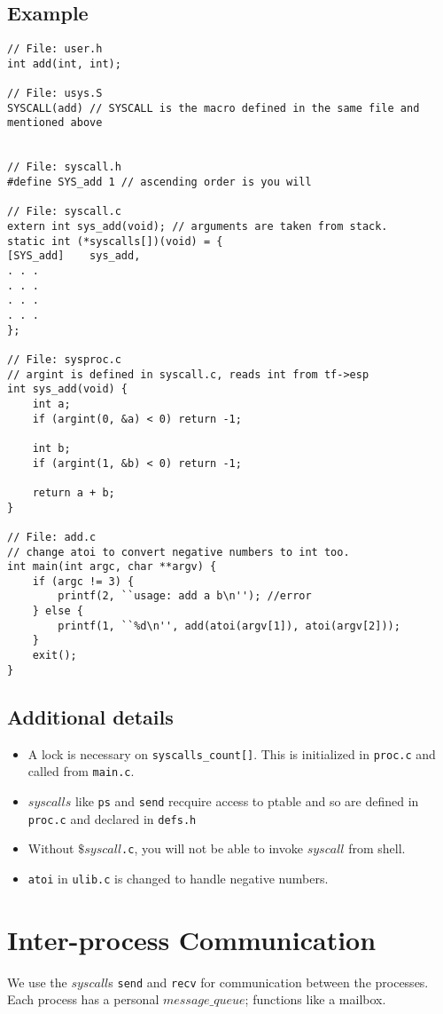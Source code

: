 \documentclass[12pt]{article}
\begin{document}
\newpage
\subsection{Example}
\begin{lstlisting}
// File: user.h
int add(int, int);

// File: usys.S
SYSCALL(add) // SYSCALL is the macro defined in the same file and mentioned above


// File: syscall.h
#define SYS_add 1 // ascending order is you will

// File: syscall.c
extern int sys_add(void); // arguments are taken from stack.
static int (*syscalls[])(void) = {
[SYS_add]    sys_add,
. . .
. . .
. . .
. . .
};

// File: sysproc.c
// argint is defined in syscall.c, reads int from tf->esp
int sys_add(void) {
    int a;
    if (argint(0, &a) < 0) return -1;

    int b;
    if (argint(1, &b) < 0) return -1;

    return a + b;
}

// File: add.c
// change atoi to convert negative numbers to int too.
int main(int argc, char **argv) {
    if (argc != 3) {
        printf(2, ``usage: add a b\n''); //error
    } else {
        printf(1, ``%d\n'', add(atoi(argv[1]), atoi(argv[2]));
    }
    exit();
}
\end{lstlisting}

\subsection{Additional details}
\begin{itemize}
    \item A lock is necessary on \texttt{syscalls\_count[]}. This is initialized
        in \texttt{proc.c} and called from \texttt{main.c}.
    \item $syscalls$ like \texttt{ps} and \texttt{send} recquire access to ptable
        and so are defined in \texttt{proc.c} and declared in \texttt{defs.h}
    \item Without \texttt{$\$syscall$.c}, you will not be able to invoke $syscall$ from
        shell.
    \item \texttt{atoi} in \texttt{ulib.c} is changed to handle negative numbers.
\end{itemize}

\section{Inter-process Communication}
We use the $syscall$s \texttt{send} and \texttt{recv} for communication between
the processes. Each process has a personal $message\_queue$; functions like a
mailbox.
\end{document}

